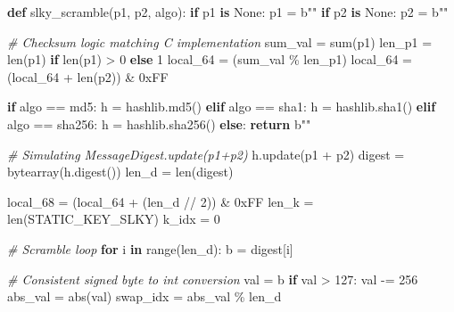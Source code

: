 \documentclass[
]{article}
\newenvironment{Shaded}{}{}
\newcommand{\BaseNTok}[1]{\textcolor[rgb]{0.25,0.63,0.44}{#1}}
\newcommand{\BuiltInTok}[1]{\textcolor[rgb]{0.00,0.50,0.00}{#1}}
\newcommand{\CommentTok}[1]{\textcolor[rgb]{0.38,0.63,0.69}{\textit{#1}}}
\newcommand{\ControlFlowTok}[1]{\textcolor[rgb]{0.00,0.44,0.13}{\textbf{#1}}}
\newcommand{\DecValTok}[1]{\textcolor[rgb]{0.25,0.63,0.44}{#1}}
\newcommand{\KeywordTok}[1]{\textcolor[rgb]{0.00,0.44,0.13}{\textbf{#1}}}
\newcommand{\NormalTok}[1]{#1}
\newcommand{\OperatorTok}[1]{\textcolor[rgb]{0.40,0.40,0.40}{#1}}
\newcommand{\StringTok}[1]{\textcolor[rgb]{0.25,0.44,0.63}{#1}}
\newcommand{\VariableTok}[1]{\textcolor[rgb]{0.10,0.09,0.49}{#1}}
\begin{document}
\begin{Shaded}
\begin{Highlighting}[]
\KeywordTok{def}\NormalTok{ slky\_scramble(p1, p2, algo):}
    \ControlFlowTok{if}\NormalTok{ p1 }\KeywordTok{is} \VariableTok{None}\NormalTok{: p1 }\OperatorTok{=} \StringTok{b""}
    \ControlFlowTok{if}\NormalTok{ p2 }\KeywordTok{is} \VariableTok{None}\NormalTok{: p2 }\OperatorTok{=} \StringTok{b""}
    
    \CommentTok{\# Checksum logic matching C implementation}
\NormalTok{    sum\_val }\OperatorTok{=} \BuiltInTok{sum}\NormalTok{(p1)}
\NormalTok{    len\_p1 }\OperatorTok{=} \BuiltInTok{len}\NormalTok{(p1) }\ControlFlowTok{if} \BuiltInTok{len}\NormalTok{(p1) }\OperatorTok{\textgreater{}} \DecValTok{0} \ControlFlowTok{else} \DecValTok{1}
\NormalTok{    local\_64 }\OperatorTok{=}\NormalTok{ (sum\_val }\OperatorTok{\%}\NormalTok{ len\_p1)}
\NormalTok{    local\_64 }\OperatorTok{=}\NormalTok{ (local\_64 }\OperatorTok{+} \BuiltInTok{len}\NormalTok{(p2)) }\OperatorTok{\&} \BaseNTok{0xFF}
    
    \ControlFlowTok{if}\NormalTok{ algo }\OperatorTok{==} \StringTok{\textquotesingle{}md5\textquotesingle{}}\NormalTok{: h }\OperatorTok{=}\NormalTok{ hashlib.md5()}
    \ControlFlowTok{elif}\NormalTok{ algo }\OperatorTok{==} \StringTok{\textquotesingle{}sha1\textquotesingle{}}\NormalTok{: h }\OperatorTok{=}\NormalTok{ hashlib.sha1()}
    \ControlFlowTok{elif}\NormalTok{ algo }\OperatorTok{==} \StringTok{\textquotesingle{}sha256\textquotesingle{}}\NormalTok{: h }\OperatorTok{=}\NormalTok{ hashlib.sha256()}
    \ControlFlowTok{else}\NormalTok{: }\ControlFlowTok{return} \StringTok{b""}
    
    \CommentTok{\# Simulating MessageDigest.update(p1+p2)}
\NormalTok{    h.update(p1 }\OperatorTok{+}\NormalTok{ p2)}
\NormalTok{    digest }\OperatorTok{=} \BuiltInTok{bytearray}\NormalTok{(h.digest())}
\NormalTok{    len\_d }\OperatorTok{=} \BuiltInTok{len}\NormalTok{(digest)}
    
\NormalTok{    local\_68 }\OperatorTok{=}\NormalTok{ (local\_64 }\OperatorTok{+}\NormalTok{ (len\_d }\OperatorTok{//} \DecValTok{2}\NormalTok{)) }\OperatorTok{\&} \BaseNTok{0xFF}
\NormalTok{    len\_k }\OperatorTok{=} \BuiltInTok{len}\NormalTok{(STATIC\_KEY\_SLKY)}
\NormalTok{    k\_idx }\OperatorTok{=} \DecValTok{0}
    
    \CommentTok{\# Scramble loop}
    \ControlFlowTok{for}\NormalTok{ i }\KeywordTok{in} \BuiltInTok{range}\NormalTok{(len\_d):}
\NormalTok{        b }\OperatorTok{=}\NormalTok{ digest[i]}
        
        \CommentTok{\# Consistent signed byte to int conversion}
\NormalTok{        val }\OperatorTok{=}\NormalTok{ b}
        \ControlFlowTok{if}\NormalTok{ val }\OperatorTok{\textgreater{}} \DecValTok{127}\NormalTok{: val }\OperatorTok{{-}=} \DecValTok{256}
\NormalTok{        abs\_val }\OperatorTok{=} \BuiltInTok{abs}\NormalTok{(val)}
\NormalTok{        swap\_idx }\OperatorTok{=}\NormalTok{ abs\_val }\OperatorTok{\%}\NormalTok{ len\_d}
        

\end{Highlighting}
\end{Shaded}
\end{document}
